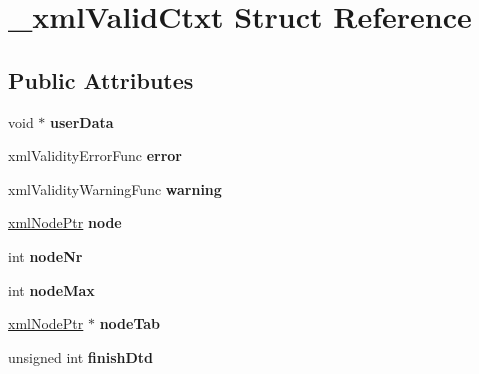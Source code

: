 \hypertarget{struct__xmlValidCtxt}{
\section{\_\-xmlValidCtxt Struct Reference}
\label{struct__xmlValidCtxt}
}
\subsection*{Public Attributes}
\begin{DoxyCompactItemize}
\item 
\hypertarget{struct__xmlValidCtxt_a669355aa1f3621673694e0860e4f78b5}{
void $\ast$ {\bfseries userData}}
\label{struct__xmlValidCtxt_a669355aa1f3621673694e0860e4f78b5}

\item 
\hypertarget{struct__xmlValidCtxt_a67cb1147c3d53a4cb2920987b091ff7a}{
xmlValidityErrorFunc {\bfseries error}}
\label{struct__xmlValidCtxt_a67cb1147c3d53a4cb2920987b091ff7a}

\item 
\hypertarget{struct__xmlValidCtxt_af4ce21729ce719fd2c84e7c8d1f69413}{
xmlValidityWarningFunc {\bfseries warning}}
\label{struct__xmlValidCtxt_af4ce21729ce719fd2c84e7c8d1f69413}

\item 
\hypertarget{struct__xmlValidCtxt_a3b3eca74a3d7965394d7cda4974e673a}{
\hyperlink{struct__xmlNode}{xmlNodePtr} {\bfseries node}}
\label{struct__xmlValidCtxt_a3b3eca74a3d7965394d7cda4974e673a}

\item 
\hypertarget{struct__xmlValidCtxt_a22247258390f6c2d960e26d915aa8bcb}{
int {\bfseries nodeNr}}
\label{struct__xmlValidCtxt_a22247258390f6c2d960e26d915aa8bcb}

\item 
\hypertarget{struct__xmlValidCtxt_acb50c245f7c4afbdb5b5e6d56f108d97}{
int {\bfseries nodeMax}}
\label{struct__xmlValidCtxt_acb50c245f7c4afbdb5b5e6d56f108d97}

\item 
\hypertarget{struct__xmlValidCtxt_ac9084ffd1c5f9d43a8809177ef838810}{
\hyperlink{struct__xmlNode}{xmlNodePtr} $\ast$ {\bfseries nodeTab}}
\label{struct__xmlValidCtxt_ac9084ffd1c5f9d43a8809177ef838810}

\item 
\hypertarget{struct__xmlValidCtxt_a34ff820a3378c7742c09f6daeacd4db5}{
unsigned int {\bfseries finishDtd}}
\label{struct__xmlValidCtxt_a34ff820a3378c7742c09f6daeacd4db5}


\end{DoxyCompactItemize}
